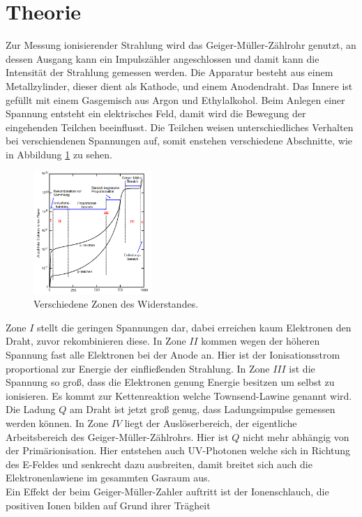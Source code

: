 \section{Theorie}
\label{sec:Theorie}
Zur Messung ionisierender Strahlung wird das Geiger-Müller-Zählrohr genutzt, an dessen Ausgang kann ein
Impulszähler angeschlossen und damit kann die Intensität der Strahlung gemessen werden.
Die Apparatur besteht aus einem Metallzylinder, dieser dient als Kathode, und einem Anodendraht. Das Innere ist gefüllt mit einem Gasgemisch
aus Argon und Ethylalkohol.
Beim Anlegen einer Spannung entsteht ein elektrisches Feld, damit wird die Bewegung der eingehenden Teilchen beeinflusst.
Die Teilchen weisen unterschiedliches Verhalten bei verschiendenen Spannungen auf, somit enstehen verschiedene Abschnitte, wie
in Abbildung \ref{fig:bereich} zu sehen.
\begin{figure}
  \centering
  \includegraphics[width=0.4\textwidth]{bereiche.PNG}
  \caption{Verschiedene Zonen des Widerstandes.\cite{sample}}
  \label{fig:bereich}
\end{figure}
Zone $I$ stellt die geringen Spannungen dar, dabei erreichen kaum Elektronen den Draht, zuvor rekombinieren diese.
In Zone $II$ kommen wegen der höheren Spannung fast alle Elektronen bei der Anode an. Hier ist der Ionisationsstrom proportional
zur Energie der einfließenden Strahlung.
In Zone $III$ ist die Spannung so groß, dass die Elektronen genung Energie besitzen um selbst zu ionisieren. Es kommt zur Kettenreaktion
welche Townsend-Lawine genannt wird. Die Ladung $Q$ am Draht ist jetzt groß genug, dass Ladungsimpulse gemessen werden können.
In Zone $IV$ liegt der Auslöserbereich, der eigentliche Arbeitsbereich des Geiger-Müller-Zählrohrs. Hier ist $Q$ nicht mehr abhängig
von der Primärionisation. Hier entstehen auch UV-Photonen welche sich in Richtung des E-Feldes und senkrecht dazu ausbreiten,
damit breitet sich auch die Elektronenlawiene im gesammten Gasraum aus.\\
Ein Effekt der beim Geiger-Müller-Zahler auftritt ist der Ionenschlauch, die positiven Ionen bilden auf Grund ihrer Trägheit
